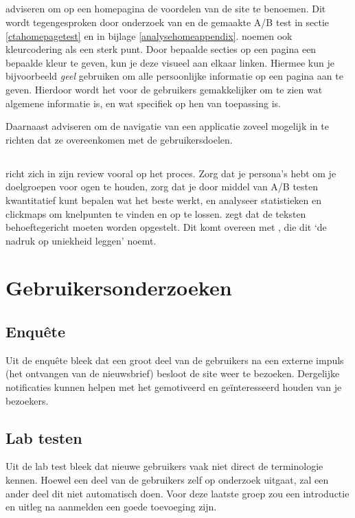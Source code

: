 \documentclass[a4paper, 10pt, pdftex]{report}
\begin{document}
      \subsection{\cite{Hoekman2008}}
        \citeauthor{Hoekman2008} adviseren om op een homepagina de voordelen van de site te benoemen. Dit wordt tegengesproken door onderzoek van \cite{Beenen2004} en de gemaakte A/B test in sectie \ref{ctahomepagetest} en in bijlage \ref{analysehomeappendix}. \citeauthor{Hoekman2008} noemen ook kleurcodering als een sterk punt. Door bepaalde secties op een pagina een bepaalde kleur te geven, kun je deze visueel aan elkaar linken. Hiermee kun je bijvoorbeeld \emph{geel} gebruiken om alle persoonlijke informatie op een pagina aan te geven. Hierdoor wordt het voor de gebruikers gemakkelijker om te zien wat algemene informatie is, en wat specifiek op hen van toepassing is.

        Daarnaast adviseren \citeauthor{Hoekman2008} om de navigatie van een applicatie zoveel mogelijk in te richten dat ze overeenkomen met de gebruikersdoelen.

      \subsection{\cite{Timmerman2008}}
        \citeauthor{Timmerman2008} richt zich in zijn review vooral op het proces. Zorg dat je persona's hebt om je doelgroepen voor ogen te houden, zorg dat je door middel van A/B testen kwantitatief kunt bepalen wat het beste werkt, en analyseer statistieken en clickmaps om knelpunten te vinden en op te lossen. \citeauthor{Timmerman2008} zegt dat de teksten behoeftegericht moeten worden opgestelt. Dit komt overeen met \cite{Beenen2004}, die dit `de nadruk op uniekheid leggen' noemt.

  \section{Gebruikersonderzoeken}
    \subsection{Enqu\^ete}
      Uit de enqu\^ete bleek dat een groot deel van de gebruikers na een externe impuls (het ontvangen van de nieuwsbrief) besloot de site weer te bezoeken. Dergelijke notificaties kunnen helpen met het gemotiveerd en ge\"interesseerd houden van je bezoekers.

    \subsection{Lab testen}
      Uit de lab test bleek dat nieuwe gebruikers vaak niet direct de terminologie kennen. Hoewel een deel van de gebruikers zelf op onderzoek uitgaat, zal een ander deel dit niet automatisch doen. Voor deze laatste groep zou een introductie en uitleg na aanmelden een goede toevoeging zijn.
\end{document}
